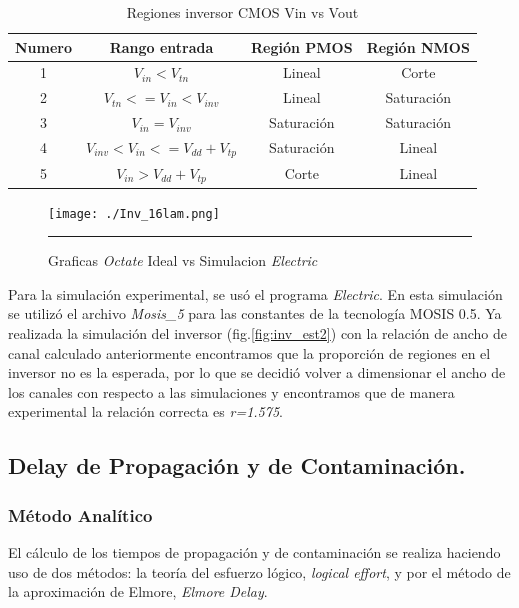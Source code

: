 \documentclass[12pt,a4paper]{article} %
\begin{document}
\begin{table}\label{table:Tabla_polarizacion}
\begin{center}
\begin{tabular}{c||c||c||c}
Numero & Rango entrada & Región PMOS & Región NMOS\\
\hline
\hline
1 & $V_{in}<V_{tn}$ & Lineal & Corte \\
2 & $V_{tn}<=V_{in}<V_{inv}$ & Lineal & Saturación \\
3 & $V_{in}=V_{inv}$ & Saturación & Saturación\\
4 & $V_{inv}<V_{in}<=V_{dd}+V_{tp}$ & Saturación & Lineal\\
5 & $V_{in}>V_{dd}+V_{tp}$ & Corte & Lineal\\
\hline
\end{tabular}
\caption{Regiones inversor CMOS Vin vs Vout}
\end{center}
\end{table}


\begin{figure}[htbp]
  \centering
    \texttt{[image: ./Inv\_16lam.png]}
    \rule{35em}{0.5pt}
  \caption[IdealvsSim]{Graficas \textit{Octate} Ideal vs Simulacion \textit{Electric}}
  \label{fig:inv_est}
\end{figure}

Para la simulación experimental, se usó el programa \textit{Electric}. En esta simulación se utilizó el archivo \textit{Mosis\_5} para las constantes de la tecnología MOSIS 0.5. Ya realizada la simulación del inversor (fig.\ref{fig:inv_est2}) con la relación de ancho de canal calculado anteriormente encontramos que la proporción de regiones en el inversor no es la esperada, por lo que se decidió volver a dimensionar el ancho de los canales con respecto a las simulaciones y encontramos que de manera experimental la relación correcta es \textit{r=1.575}. 




\subsection{Delay de Propagación y de Contaminación.}

\subsubsection{Método Analítico}

El cálculo de los tiempos de propagación y de contaminación se realiza haciendo uso de dos métodos: la teoría del esfuerzo lógico, \textit{logical effort}, y por el método de la aproximación de Elmore, \textit{Elmore Delay}.\\
\end{document}
